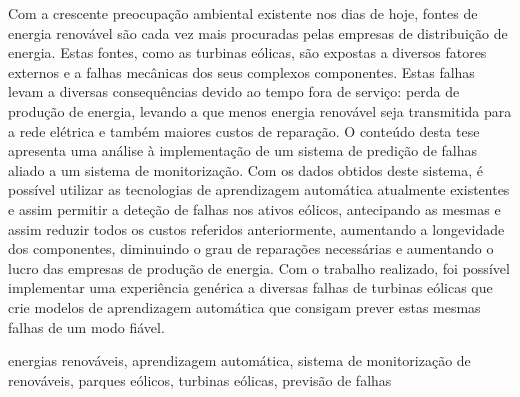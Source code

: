 




Com a crescente preocupação ambiental existente nos dias de hoje, fontes de energia renovável são cada vez mais procuradas pelas empresas de distribuição de energia. Estas fontes, como as turbinas eólicas, são expostas a diversos fatores externos e a falhas mecânicas dos seus complexos componentes. Estas falhas levam a diversas consequências devido ao tempo fora de serviço: perda de produção de energia, levando a que menos energia renovável seja transmitida para a rede elétrica e também maiores custos de reparação. O conteúdo desta tese apresenta uma análise à implementação de um sistema de predição de falhas aliado a um sistema de monitorização. Com os dados obtidos deste sistema, é possível utilizar as tecnologias de aprendizagem automática atualmente existentes e assim permitir a deteção de falhas nos ativos eólicos, antecipando as mesmas e assim reduzir todos os custos referidos anteriormente, aumentando a longevidade dos componentes, diminuindo o grau de reparações necessárias e aumentando o lucro das empresas de produção de energia.
Com o trabalho realizado, foi possível implementar uma experiência genérica a diversas falhas de turbinas eólicas que crie modelos de aprendizagem automática que consigam prever estas mesmas falhas de um modo fiável.

\begin{keywords}
energias renováveis, aprendizagem automática, sistema de monitorização de renováveis, parques eólicos, turbinas eólicas, previsão de falhas
\end{keywords}
